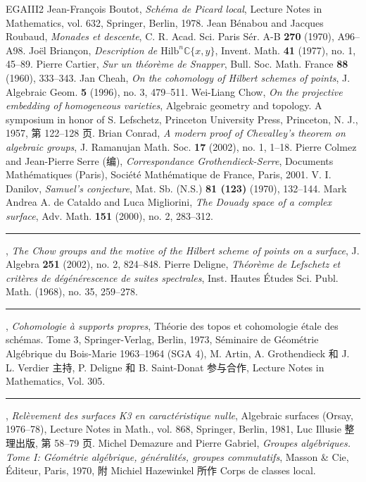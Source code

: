 \begin{thebibliography}{EGAIII2}
 Jean-François Boutot, \emph{Schéma de Picard local}, Lecture Notes in Mathematics, vol. 632, Springer, Berlin, 1978.
 Jean Bénabou and Jacques Roubaud, \emph{Monades et descente}, C. R. Acad. Sci. Paris Sér. A-B \textbf{270} (1970), A96--A98.
 Joël Briançon, \emph{Description de $\mathrm{Hilb}^n\mathbb C\{x,y\}$}, Invent. Math. \textbf{41} (1977), no. 1, 45--89.
 Pierre Cartier, \emph{Sur un théorème de Snapper}, Bull. Soc. Math. France \textbf{88} (1960), 333--343.
 Jan Cheah, \emph{On the cohomology of Hilbert schemes of points}, J. Algebraic Geom. \textbf{5} (1996), no. 3, 479--511.
 Wei-Liang Chow, \emph{On the projective embedding of homogeneous varieties}, Algebraic geometry and topology. A symposium in honor of S. Lefschetz, Princeton University Press, Princeton, N. J., 1957, 第 122--128 页.
 Brian Conrad, \emph{A modern proof of Chevalley's theorem on algebraic groups}, J. Ramanujan Math. Soc. \textbf{17} (2002), no. 1, 1--18.
 Pierre Colmez and Jean-Pierre Serre (编), \emph{Correspondance Grothendieck-Serre}, Documents Mathématiques (Paris), Société Mathématique de France, Paris, 2001.
 V. I. Danilov, \emph{Samuel's conjecture}, Mat. Sb. (N.S.) \textbf{81 (123)} (1970), 132--144.
 Mark Andrea A. de Cataldo and Luca Migliorini, \emph{The Douady space of a complex surface}, Adv. Math. \textbf{151} (2000), no. 2, 283--312.
 \rule{2em}{.3pt}, \emph{The Chow groups and the motive of the Hilbert scheme of points on a surface}, J. Algebra \textbf{251} (2002), no. 2, 824--848.
 Pierre Deligne, \emph{Théorème de Lefschetz et critères de dégénérescence de suites spectrales}, Inst. Hautes Études Sci. Publ. Math. (1968), no. 35, 259--278.
 \rule{2em}{.3pt}, \emph{Cohomologie à supports propres}, Théorie des topos et cohomologie étale des schémas. Tome 3, Springer-Verlag, Berlin, 1973, Séminaire de Géométrie Algébrique du Bois-Marie 1963--1964 (SGA 4), M. Artin, A. Grothendieck 和 J. L. Verdier 主持, P. Deligne 和 B. Saint-Donat 参与合作, Lecture Notes in Mathematics, Vol. 305.
 \rule{2em}{.3pt}, \emph{Relèvement des surfaces K3 en caractéristique nulle}, Algebraic surfaces (Orsay, 1976--78), Lecture Notes in Math., vol. 868, Springer, Berlin, 1981, Luc Illusie 整理出版, 第 58--79 页.
 Michel Demazure and Pierre Gabriel, \emph{Groupes algébriques. Tome I: Géométrie algébrique, généralités, groupes commutatifs}, Masson \& Cie, Éditeur, Paris, 1970, 附 Michiel Hazewinkel 所作 Corps de classes local.

\end{thebibliography}
